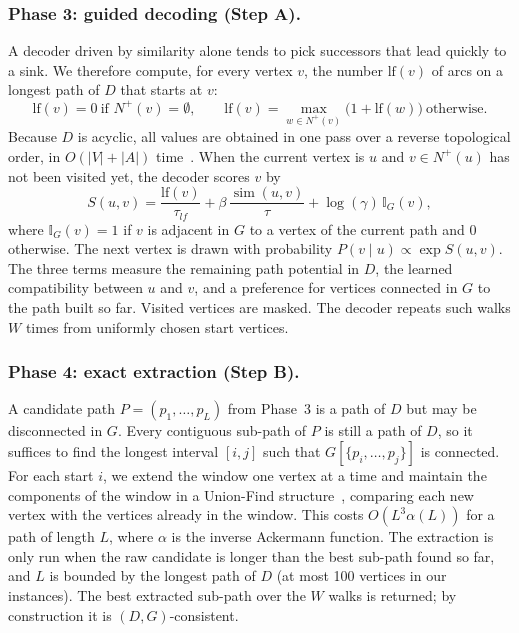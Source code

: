 \documentclass{llncs}
\begin{document}
\subsubsection{Phase 3: guided decoding (Step A).}
A decoder driven by similarity alone tends to pick successors that lead quickly to a sink. We therefore compute, for every vertex $v$, the number $\mathrm{lf}(v)$ of arcs on a longest path of $D$ that starts at $v$:
\begin{equation}
\mathrm{lf}(v) = 0 \ \text{if } N^+(v)=\emptyset, \qquad \mathrm{lf}(v)=\max_{w\in N^+(v)}\bigl(1+\mathrm{lf}(w)\bigr) \ \text{otherwise}.
\end{equation}
Because $D$ is acyclic, all values are obtained in one pass over a reverse topological order, in $O(|V|+|A|)$ time~\cite{bellman1958}. When the current vertex is $u$ and $v\in N^+(u)$ has not been visited yet, the decoder scores $v$ by
\begin{equation}
S(u,v) = \frac{\mathrm{lf}(v)}{\tau_{lf}} + \beta\,\frac{\operatorname{sim}(u,v)}{\tau} + \log(\gamma)\,\mathbb{I}_G(v),
\end{equation}
where $\mathbb{I}_G(v)=1$ if $v$ is adjacent in $G$ to a vertex of the current path and $0$ otherwise. The next vertex is drawn with probability $P(v\mid u)\propto\exp S(u,v)$. The three terms measure the remaining path potential in $D$, the learned compatibility between $u$ and $v$, and a preference for vertices connected in $G$ to the path built so far. Visited vertices are masked. The decoder repeats such walks $W$ times from uniformly chosen start vertices.

\subsubsection{Phase 4: exact extraction (Step B).}
A candidate path $P=(p_1,\ldots,p_L)$ from Phase~3 is a path of $D$ but may be disconnected in $G$. Every contiguous sub-path of $P$ is still a path of $D$, so it suffices to find the longest interval $[i,j]$ such that $G[\{p_i,\ldots,p_j\}]$ is connected. For each start $i$, we extend the window one vertex at a time and maintain the components of the window in a Union-Find structure~\cite{tarjan1975}, comparing each new vertex with the vertices already in the window. This costs $O(L^3\alpha(L))$ for a path of length $L$, where $\alpha$ is the inverse Ackermann function. The extraction is only run when the raw candidate is longer than the best sub-path found so far, and $L$ is bounded by the longest path of $D$ (at most 100 vertices in our instances). The best extracted sub-path over the $W$ walks is returned; by construction it is $(D,G)$-consistent.
\end{document}
